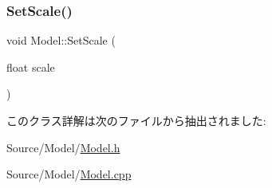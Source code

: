 \subsubsection{\texorpdfstring{Set\+Scale()}{SetScale()}\hspace{0.1cm}{\footnotesize\ttfamily [2/2]}}
{\footnotesize\ttfamily void Model\+::\+Set\+Scale (\begin{DoxyParamCaption}\item[{float}]{scale }\end{DoxyParamCaption})}



このクラス詳解は次のファイルから抽出されました\+:\begin{DoxyCompactItemize}
\item 
Source/\+Model/\mbox{\hyperlink{_model_8h}{Model.\+h}}\item 
Source/\+Model/\mbox{\hyperlink{_model_8cpp}{Model.\+cpp}}\end{DoxyCompactItemize}
